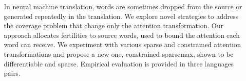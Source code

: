 In neural machine translation, words are sometimes dropped from the source or generated repeatedly in the translation. We explore novel strategies to address the coverage problem that change only the attention transformation. Our approach allocates fertilities to source words, used to bound the attention each word can receive. We experiment with various sparse and constrained attention transformations and propose a new one, constrained sparsemax, shown to be differentiable and sparse. Empirical evaluation is provided in three languages pairs.
